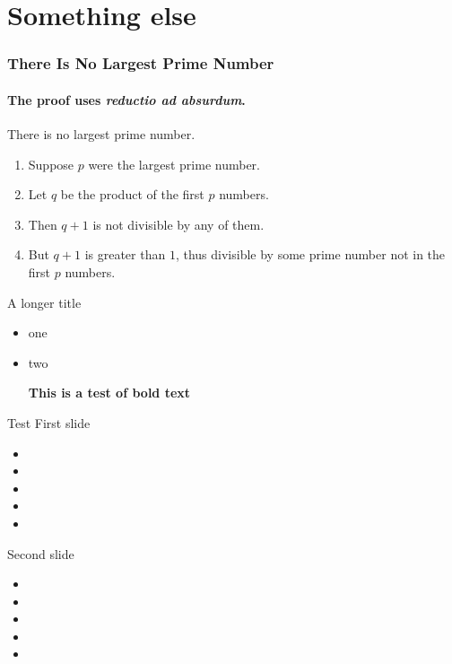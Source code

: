 \documentclass[aspectratio=169]{beamer}
\begin{document}
\section{Something else}

\begin{frame}
\frametitle{There Is No Largest Prime Number}
\framesubtitle{The proof uses \textit{reductio ad absurdum}.}
\begin{theorem}
There is no largest prime number. \end{theorem}
\begin{enumerate}
\item<1-| alert@1> Suppose $p$ were the largest prime number.
\item<2-> Let $q$ be the product of the first $p$ numbers.
\item<3-> Then $q+1$ is not divisible by any of them.
\item<1-> But $q + 1$ is greater than $1$, thus divisible by some prime
number not in the first $p$ numbers.
\end{enumerate}
\end{frame}

\begin{frame}{A longer title}
\begin{itemize}
\item one
\item two

\textbf{This is a test of bold text}

\end{itemize}
\end{frame}

\begin{frame}[allowframebreaks]{Test}
  First slide
  \begin{itemize}
    \item
    \item
    \item
    \item
    \item
  \end{itemize}
  \framebreak
  Second slide
  \begin{itemize}
    \item
    \item
    \item
    \item
    \item
  \end{itemize}
\end{frame}
\end{document}

